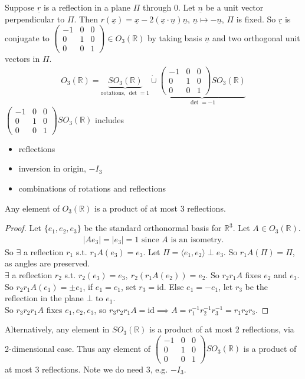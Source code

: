 Suppose $\underline{r}$ is a reflection in a plane $\Pi$ through 0.
Let $\underline{n}$ be a unit vector perpendicular to $\Pi$.
Then $r(\underline{x}) = \underline{x} - 2 (\underline{x} \cdot \underline{n}) \underline{n}$, $\underline{n} \mapsto - \underline{n}$, $\Pi$ is fixed.
So $\underline{r}$ is conjugate to $\begin{pmatrix}-1 & 0 & 0 \\0 & 1 & 0 \\0 & 0 & 1\end{pmatrix} \in O_3(\mathbb{R})$ by taking basis $\underline{n}$ and two orthogonal unit vectors in $\Pi$.
\begin{align*}
    O_3(\mathbb{R}) = \underbrace{SO_3(\mathbb{R})}_\text{rotations, $\det = 1$} \mathbin{\dot{\cup}} \underbrace{\begin{pmatrix}-1 & 0 & 0 \\0 & 1 & 0 \\0 & 0 & 1\end{pmatrix} SO_3(\mathbb{R})}_{\det = -1}
\end{align*} 
$\begin{pmatrix}-1 & 0 & 0 \\0 & 1 & 0 \\0 & 0 & 1\end{pmatrix} SO_3(\mathbb{R})$ includes
\begin{itemize}
    \item reflections
    \item inversion in origin, $-I_3$
    \item combinations of rotations and reflections
\end{itemize} 

\begin{theorem}\label{thm:13}
    Any element of $O_3(\mathbb{R})$ is a product of at most 3 reflections.
\end{theorem} 

\begin{proof}
    Let $\{e_1, e_2, e_3\}$ be the standard orthonormal basis for $\mathbb{R}^3$.
    Let $A \in O_3(\mathbb{R})$.
    \begin{align*}
        |A e_3| = |e_3| = 1 \text{ since $A$ is an isometry.}
    \end{align*} 
    So $\exists$ a reflection $r_1$ s.t. $r_1 A(e_3) = e_3$.
    Let $\Pi = \langle e_1, e_2 \rangle \perp e_3$.
    So $r_1 A(\Pi) = \Pi$, as angles are preserved. \\
    $\exists$ a reflection $r_2$ s.t. $r_2(e_3) = e_3,\ r_2(r_1 A (e_2)) = e_2$.
    So $r_2 r_1 A$ fixes $e_2$ and $e_3$. \\
    So $r_2 r_1 A (e_1) = \pm e_1$, if $e_1 = e_1$, set $r_3 = \text{id}$.
    Else $e_1 = - e_1$, let $r_3$ be the reflection in the plane $\bot$ to $e_1$. \\
    So $r_3 r_2 r_1 A$ fixes $e_1, e_2, e_3$, so $r_3 r_2 r_1 A = \text{id} \implies A = r_1^{-1} r_2^{-1} r_3^{-1} = r_1 r_2 r_3$.
\end{proof} 

Alternatively, any element in $SO_3(\mathbb{R})$ is a product of at most 2 reflections, via 2-dimensional case.
Thus any element of $\begin{pmatrix}-1 & 0 & 0 \\0 & 1 & 0 \\0 & 0 & 1\end{pmatrix} SO_3(\mathbb{R})$ is a product of at most 3 reflections.
Note we do need $3$, e.g. $-I_3$.